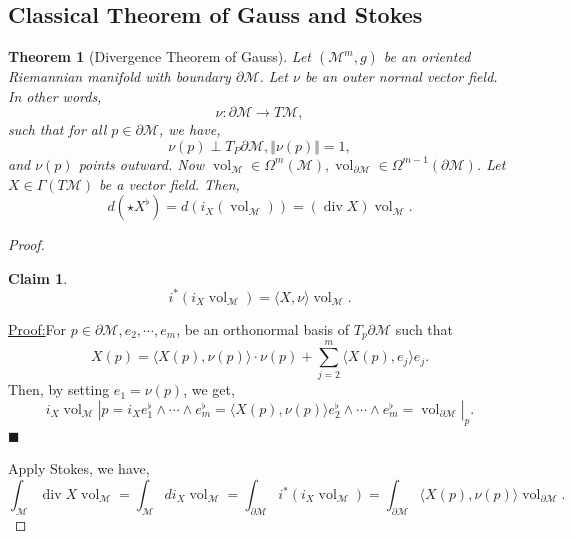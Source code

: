 \documentclass[10pt]{article}
\newtheorem{theorem}{Theorem} [section]
\newtheorem{claim}{Claim}
\newenvironment{claimproof}[1]{\par\noindent\underline{Proof:}\space#1}{\hfill $\blacksquare$}
\DeclareMathOperator{\vol}{vol}
\DeclareMathOperator{\diverg}{div}
\newcommand{\norm}[1]{\Vert #1 \Vert}
\newcommand{\M}[0]{\mathcal{M}}
\begin{document}
\subsection{Classical Theorem of Gauss and Stokes}

\begin{theorem}[Divergence Theorem of Gauss]
  \label{theorem_divergence_gauss}
  Let $(\M^m,g)$ be an oriented Riemannian manifold with boundary $\partial\M$. Let $\nu$ be an outer normal vector field. In other words,
  \begin{equation*}
    \nu:\partial\M\to T\M,
  \end{equation*}
  such that for all $p\in\partial\M$, we have,
  \begin{equation*}
    \nu(p)\perp T_P\partial\M,\norm{\nu(p)}=1,
  \end{equation*}
  and $\nu(p)$ points outward. Now $\vol_\M\in\Omega^m(\M),\vol_{\partial\M}\in\Omega^{m-1}(\partial\M)$. Let $X\in \Gamma(T\M)$ be a vector field. Then,
  \begin{equation*}
    d(\star X^\flat)=d(i_X(\vol_\M)) = (\diverg X)\vol_\M.
  \end{equation*}
\end{theorem}
\setcounter{claim}{0}
\begin{proof}
  \begin{claim}
  \begin{equation*}
    i^*(i_X\vol_\M) = \langle X,\nu\rangle\vol_\M.
  \end{equation*}
  \end{claim}
  \begin{claimproof}
    For $p\in\partial\M,e_2,\cdots,e_m$, be an orthonormal basis of $T_p\partial\M$ such that 
    \begin{equation*}
      X(p) = \langle X(p),\nu(p)\rangle\cdot\nu(p)+\sum_{j=2}^m\langle X(p),e_j\rangle e_j.
    \end{equation*}
    Then, by setting $e_1 = \nu(p)$, we get,
    \begin{equation*}
      i_X\vol_{\M}|p = i_Xe_1^\flat\wedge\cdots\wedge e_m^\flat = \langle X(p),\nu(p)\rangle e_2^\flat\wedge\cdots\wedge e_m^\flat = \vol_{\partial\M}|_p.
    \end{equation*}
  \end{claimproof}
  \par Apply Stokes, we have,
  \begin{equation*}
    \int_\M \diverg X\vol_\M = \int_\M di_X\vol_\M=\int_{\partial\M}i^*(i_X\vol_\M) = \int_{\partial\M}\langle X(p),\nu(p)\rangle\vol_{\partial\M}.
  \end{equation*}
\end{proof}
\end{document}
